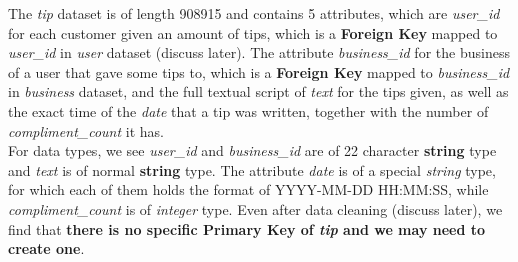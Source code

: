 \documentclass[runningheads]{llncs}
\begin{document}
The \textit{tip} dataset is of length 908915 and contains 5 attributes, which are \textit{user\_id} for each customer given an amount of tips, which is a \textbf{Foreign Key} mapped to \textit{user\_id} in \textit{user} dataset (discuss later). The attribute \textit{business\_id} for the business of a user that gave some tips to, which is a \textbf{Foreign Key} mapped to \textit{business\_id} in \textit{business} dataset, and the full textual script of \textit{text} for the tips given, as well as the exact time 
 of the \textit{date} that a tip was written, together with the number of \textit{compliment\_count} it has. \\
For data types, we see \textit{user\_id} and \textit{business\_id} are of 22 character \textbf{string} type and \textit{text} is of normal \textbf{string} type. The attribute \textit{date} is of a special \textit{string} type, for which each of them holds the format of YYYY-MM-DD HH:MM:SS, while \textit{compliment\_count} is of \textit{integer} type. Even after data cleaning (discuss later), we find that \textbf{there is no specific Primary Key of \textit{tip} and we may need to create one}. \\
\end{document}
